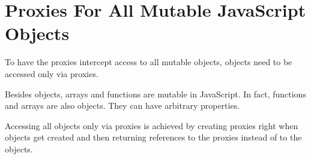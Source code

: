 % 
% 
% 







\section{Proxies For All Mutable JavaScript Objects}

To have the proxies intercept access to all mutable objects, objects need to be accessed only via proxies.

Besides objects, arrays and functions are mutable in JavaScript.
In fact, functions and arrays are also objects.
They can have arbitrary properties.



Accessing all objects only via proxies is achieved by creating proxies right when objects get created and then returning references to the proxies instead of to the objects.


